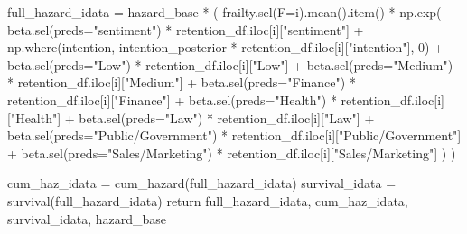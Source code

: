 \documentclass[
  letterpaper,
  DIV=11,
  numbers=noendperiod]{scrartcl}
\newenvironment{Shaded}{\begin{snugshade}}{\end{snugshade}}
\newcommand{\ControlFlowTok}[1]{\textcolor[rgb]{0.00,0.23,0.31}{#1}}
\newcommand{\DecValTok}[1]{\textcolor[rgb]{0.68,0.00,0.00}{#1}}
\newcommand{\NormalTok}[1]{\textcolor[rgb]{0.00,0.23,0.31}{#1}}
\newcommand{\OperatorTok}[1]{\textcolor[rgb]{0.37,0.37,0.37}{#1}}
\newcommand{\StringTok}[1]{\textcolor[rgb]{0.13,0.47,0.30}{#1}}
\begin{document}
\begin{Shaded}
\begin{Highlighting}[]
\NormalTok{    full\_hazard\_idata }\OperatorTok{=}\NormalTok{ hazard\_base }\OperatorTok{*}\NormalTok{ (}
\NormalTok{        frailty.sel(F}\OperatorTok{=}\NormalTok{i).mean().item()}
        \OperatorTok{*}\NormalTok{ np.exp(}
\NormalTok{            beta.sel(preds}\OperatorTok{=}\StringTok{"sentiment"}\NormalTok{) }\OperatorTok{*}\NormalTok{ retention\_df.iloc[i][}\StringTok{"sentiment"}\NormalTok{]}
            \OperatorTok{+}\NormalTok{ np.where(intention, intention\_posterior }\OperatorTok{*}\NormalTok{ retention\_df.iloc[i][}\StringTok{"intention"}\NormalTok{], }\DecValTok{0}\NormalTok{)}
            \OperatorTok{+}\NormalTok{ beta.sel(preds}\OperatorTok{=}\StringTok{"Low"}\NormalTok{) }\OperatorTok{*}\NormalTok{ retention\_df.iloc[i][}\StringTok{"Low"}\NormalTok{]}
            \OperatorTok{+}\NormalTok{ beta.sel(preds}\OperatorTok{=}\StringTok{"Medium"}\NormalTok{) }\OperatorTok{*}\NormalTok{ retention\_df.iloc[i][}\StringTok{"Medium"}\NormalTok{]}
            \OperatorTok{+}\NormalTok{ beta.sel(preds}\OperatorTok{=}\StringTok{"Finance"}\NormalTok{) }\OperatorTok{*}\NormalTok{ retention\_df.iloc[i][}\StringTok{"Finance"}\NormalTok{]}
            \OperatorTok{+}\NormalTok{ beta.sel(preds}\OperatorTok{=}\StringTok{"Health"}\NormalTok{) }\OperatorTok{*}\NormalTok{ retention\_df.iloc[i][}\StringTok{"Health"}\NormalTok{]}
            \OperatorTok{+}\NormalTok{ beta.sel(preds}\OperatorTok{=}\StringTok{"Law"}\NormalTok{) }\OperatorTok{*}\NormalTok{ retention\_df.iloc[i][}\StringTok{"Law"}\NormalTok{]}
            \OperatorTok{+}\NormalTok{ beta.sel(preds}\OperatorTok{=}\StringTok{"Public/Government"}\NormalTok{) }\OperatorTok{*}\NormalTok{ retention\_df.iloc[i][}\StringTok{"Public/Government"}\NormalTok{]}
            \OperatorTok{+}\NormalTok{ beta.sel(preds}\OperatorTok{=}\StringTok{"Sales/Marketing"}\NormalTok{) }\OperatorTok{*}\NormalTok{ retention\_df.iloc[i][}\StringTok{"Sales/Marketing"}\NormalTok{]}
\NormalTok{        )}
\NormalTok{    )}

\NormalTok{    cum\_haz\_idata }\OperatorTok{=}\NormalTok{ cum\_hazard(full\_hazard\_idata)}
\NormalTok{    survival\_idata }\OperatorTok{=}\NormalTok{ survival(full\_hazard\_idata)}
    \ControlFlowTok{return}\NormalTok{ full\_hazard\_idata, cum\_haz\_idata, survival\_idata, hazard\_base}



\end{Highlighting}
\end{Shaded}
\end{document}
